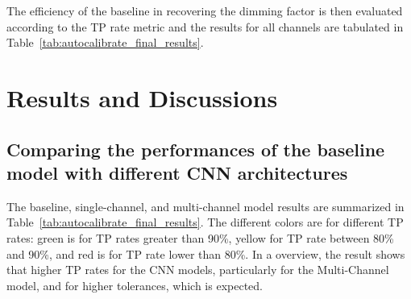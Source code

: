 \documentclass[twocolumn,usenames,dvipsnames]{aastex63}
\begin{document}


The efficiency of the baseline in recovering the dimming factor is then evaluated according to the TP rate metric and the results for all channels are tabulated in Table~\ref{tab:autocalibrate_final_results}. 

\section{Results and Discussions}
 \label{Section:Results}

\subsection{Comparing the performances of the baseline model with different CNN architectures}
The baseline, single-channel, and multi-channel model results are summarized in Table~\ref{tab:autocalibrate_final_results}. The different colors are for different TP rates: green is for TP rates greater than 90\%, yellow for TP rate between 80\% and 90\%, and red is for TP rate lower than 80\%. In a overview, the result shows that higher TP rates for the CNN models, particularly for the Multi-Channel model, and for higher tolerances, which is expected.
\end{document}
